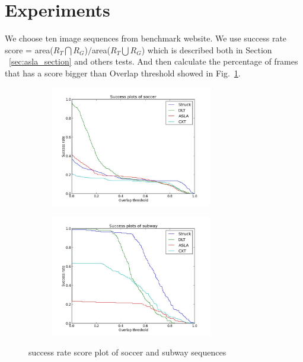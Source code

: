 \documentclass{article}
\begin{document}
\section{Experiments}
We choose ten image sequences from benchmark website\cite{dataset}. We use success rate score = area($R_T \bigcap R_G$)$/$area($R_T \bigcup R_G$) which is described both in Section ~\ref{sec:asla_section} and others tests\cite{benchmark}. And then calculate the percentage of frames that has a score bigger than Overlap threshold showed in Fig.~\ref{fig:soccer}.

\begin{figure}[hbt]
  \begin{subfigure}[b]{0.5\textwidth}
    \includegraphics[width=200pt]{soccer.jpg}
    \label{fig:soccer}
  \end{subfigure}
  \begin{subfigure}[b]{0.5\textwidth}
    \includegraphics[width=200pt]{subway.jpg}
    \label{fig:subway}
  \end{subfigure}
  \caption{success rate score plot of soccer and subway sequences}
\end{figure}
\end{document}
